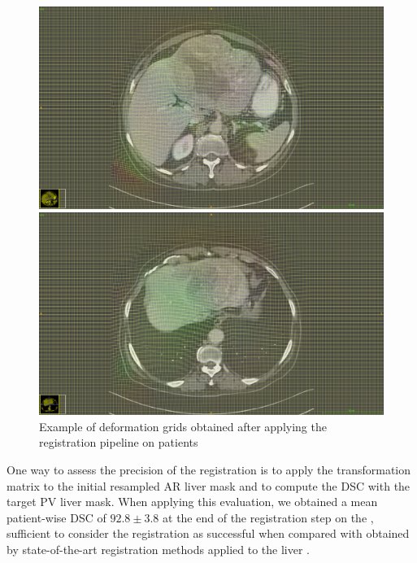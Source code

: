 \begin{figure}
\centering
\begin{minipage}{0.7\linewidth}
\includegraphics[width=\linewidth]{./images/TCIA_TCGA-DD-A11A_deformation_grid_slice49}
\end{minipage}

\vspace{0.8cm}
\begin{minipage}{0.7\linewidth}
\includegraphics[width=\linewidth]{./images/TCIA_TCGA-DD-A11A_deformation_grid_slice68}
\end{minipage}
\caption{Example of deformation grids obtained after applying the registration pipeline on  patients}
\label{fig:deformationGridExamples}
\end{figure}

One way to assess the precision of the registration is to apply the
transformation matrix to the initial resampled AR liver mask and to
compute the DSC with the target PV liver mask. When applying this
evaluation, we obtained a mean patient-wise DSC of $ 92.8 \pm 3.8 $ at the
end of the registration step on the , sufficient to consider the
registration as successful when compared with obtained by state-of-the-art
registration methods applied to the liver \cite{Zhao2019}.

